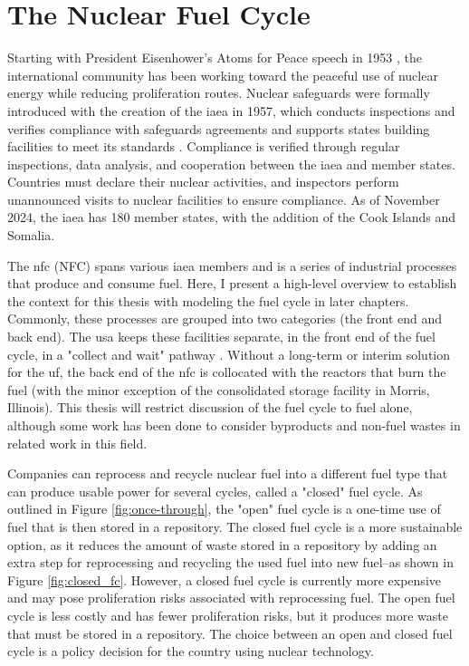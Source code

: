 \section{The Nuclear Fuel Cycle}
\label{sec:nfc}

Starting with President Eisenhower's Atoms for Peace speech in 1953
\cite{atoms_for_peace}, the international community has been working toward the peaceful use of nuclear energy while reducing proliferation routes. Nuclear safeguards were formally introduced with the creation of the \gls{iaea} in 1957, which conducts inspections and verifies compliance with safeguards agreements and supports states building facilities to meet its standards \cite{member_states}. Compliance is verified through regular inspections, data analysis, and cooperation between the \gls{iaea} and member states. Countries must declare their nuclear activities, and inspectors perform unannounced visits to nuclear facilities to ensure compliance. As of November 2024, the \gls{iaea} has 180 member states, with the addition of the Cook Islands and Somalia.

The \acrlong{nfc} (NFC) spans various \gls{iaea} members and is a series of industrial processes that produce and consume fuel. Here, I present a high-level overview to establish the context for this thesis with modeling the fuel cycle in later chapters. Commonly, these processes are grouped into two categories (the front end and back end). The \gls{usa} keeps these facilities separate, in the front end of the fuel cycle, in a "collect and wait" pathway \cite{cycle_risks}. Without a long-term or interim solution for the \gls{uf}, the back end of the \gls{nfc} is collocated with the reactors that burn the fuel (with the minor exception of the consolidated storage facility in Morris, Illinois). This thesis will restrict discussion of the fuel cycle to fuel alone, although some work has been done to consider byproducts and non-fuel wastes in related work in this field.

Companies can reprocess and recycle nuclear fuel into a different fuel type
that can produce usable power for several cycles, called a "closed" fuel cycle.
As outlined in Figure \ref{fig:once-through}, the "open" fuel cycle is a
one-time use of fuel that is then stored in a repository. The closed fuel cycle
is a more sustainable option, as it reduces the amount of waste stored in a
repository by adding an extra step for reprocessing and recycling the used fuel
into new fuel--as shown in Figure \ref{fig:closed_fc}. However, a closed fuel
cycle is currently more expensive and may pose proliferation risks associated with reprocessing fuel. The open fuel cycle is less costly and has fewer
proliferation risks, but it produces more waste that must be stored in a
repository. The choice between an open and closed fuel cycle is a policy decision for the country using nuclear technology.


